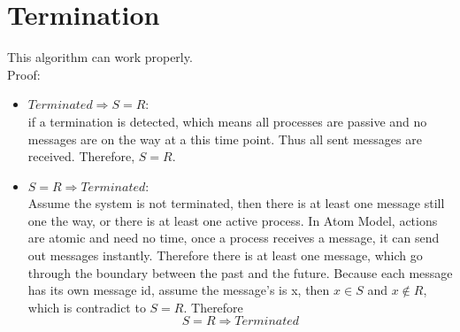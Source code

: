 \documentclass[a4paper, 14pt]{article}
\begin{document}
\section{Termination}
This algorithm can work properly.\\
Proof: \\
\begin{itemize}
	\item $Terminated \Rightarrow S = R$:\\
if a termination is detected, which means all processes are passive and no messages are on the way at a this time point. Thus all sent messages are received. Therefore, $S = R$.\\
	\item $S = R \Rightarrow Terminated$:\\
Assume the system is not terminated, then there is at least one message still one the way, or there is at least one active process. In Atom Model, actions are atomic and need no time, once a process receives a message, it can send out messages instantly. Therefore there is at least one message, which go through the boundary between the past and the future. Because each message has its own message id, assume the message's is x, then $x \in S $ and $x \notin R$, which is contradict to $S = R$. Therefore $$S = R \Rightarrow Terminated$$\\
\end{itemize}
\end{document}
